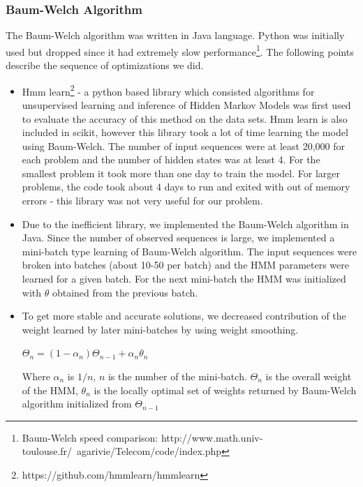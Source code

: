 \documentclass[letterpaper]{article}
\begin{document}
\subsubsection{Baum-Welch Algorithm}

The Baum-Welch algorithm was written in Java language. Python was initially used but dropped since it had extremely slow performance\footnote{Baum-Welch speed comparison: http://www.math.univ-toulouse.fr/~agarivie/Telecom/code/index.php}. The following points describe the sequence of optimizations we did.

\begin{itemize}
\item Hmm learn\footnote{https://github.com/hmmlearn/hmmlearn} - a python based library which consisted algorithms for unsupervised learning and inference of Hidden Markov Models was first used to evaluate the accuracy of this method on the data sets. Hmm learn is also included in scikit, however this library took a lot of time learning the model using Baum-Welch. The number of input sequences were at least 20,000 for each problem and the number of hidden states was at least 4. For the smallest problem it took more than one day to train the model. For larger problems, the code took about 4 days to run and exited with out of memory errors - this library was not very useful for our problem.

\item Due to the inefficient library, we implemented the Baum-Welch algorithm in Java. Since the number of observed sequences is large, we implemented a mini-batch type learning of Baum-Welch algorithm. The input sequences were broken into batches (about 10-50 per batch) and the HMM parameters were learned for a given batch. For the next mini-batch the HMM was initialized with $\theta$ obtained from the previous batch.

\item To get more stable and accurate solutions, we decreased contribution of the weight learned by later mini-batches by using weight smoothing.

\begin{center}
$\Theta_{n} = (1-\alpha_{n})\Theta_{n-1} + \alpha_{n} \theta_{n}$
\end{center}

Where $\alpha_{n}$ is $1/n$, $n$ is the number of the mini-batch. $\Theta_{n}$ is the overall weight of the HMM, $\theta_{n}$ is the locally optimal set of weights returned by Baum-Welch algorithm initialized from $\Theta_{n-1}$ 



\end{itemize}
\end{document}
